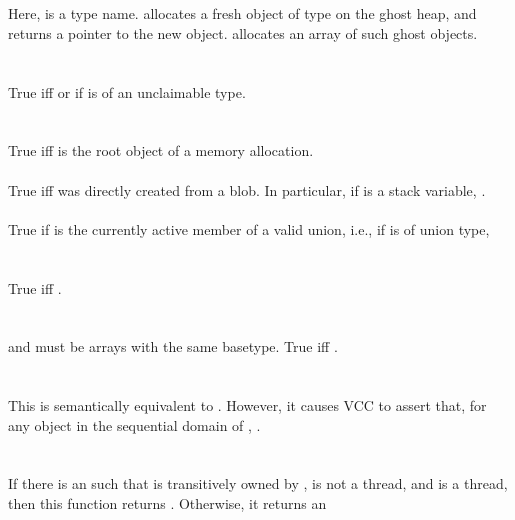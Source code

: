 \documentclass[preprint,nocopyrightspace]{sigplanconf}
\begin{document}
{{{{\begin{VCC}
\\
\\
Here,  is a type name.  allocates a fresh object
of type  on the ghost heap, and returns a pointer to the new
object.  allocates an array of  such
ghost objects.
\\\\
\\
True iff  or if  is of an unclaimable type.
\\\\
\\
True iff  is the root object of a memory allocation.
\\
\\
True iff  was directly created from a blob. In particular,
if  is a stack variable, . 
\\
\\
True if  is the currently active member of a valid union, i.e.,
if  is of union type, 
\\\\
\\
True iff .
\\\\
\\
 and  must be arrays with the same basetype.
True iff .
\\\\
\\
This is semantically equivalent to . However, it
causes VCC to assert that, for any object  in the sequential
domain of , .
\\\\
\\
If there is an  such that  is transitively
owned by ,  is not a thread, and  is a
thread, then this function returns . Otherwise, it returns an

\end{VCC}}}}}
\end{document}
